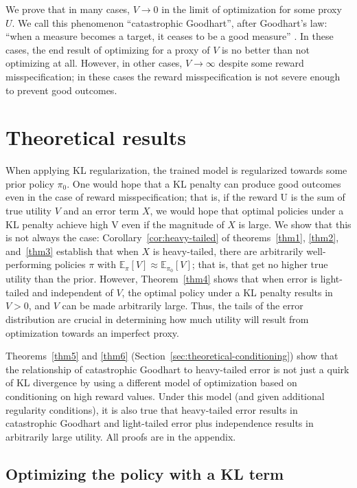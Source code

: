 \documentclass{article}
\begin{document}
We prove that in many cases, $V \to 0$ in the limit of optimization for some proxy $U$. We call this phenomenon ``catastrophic Goodhart'', after Goodhart's law: ``when a measure becomes a target, it ceases to be a good measure'' \citep{Strathern_1997}. In these cases, the end result of optimizing for a proxy of $V$ is no better than not optimizing at all. However, in other cases, $V \to \infty$ despite some reward misspecification; in these cases the reward misspecification is not severe enough to prevent good outcomes. 

\section{Theoretical results}

When applying KL regularization, the trained model is regularized towards some prior policy $\pi_0$. One would hope that a KL penalty can produce good outcomes even in the case of reward misspecification; that is, if the reward U is the sum of true utility $V$ and an error term $X$, we would hope that optimal policies under a KL penalty achieve high V even if the magnitude of $X$ is large. We show that this is not always the case: Corollary~\ref{cor:heavy-tailed} of theorems~\ref{thm1}, \ref{thm2}, and~\ref{thm3} establish that when $X$ is heavy-tailed, there are arbitrarily well-performing policies $\pi$ with $\mathbb E_{\pi}[V] \approx \mathbb E_{\pi_0}[V]$; that is, that get no higher true utility than the prior. However, Theorem~\ref{thm4} shows that when error is light-tailed and independent of $V$, the optimal policy under a KL penalty results in $V > 0$, and $V$ can be made arbitrarily large. Thus, the tails of the error distribution are crucial in determining how much utility will result from optimization towards an imperfect proxy.

Theorems~\ref{thm5} and \ref{thm6} (Section~\ref{sec:theoretical-conditioning}) show that the relationship of catastrophic Goodhart to heavy-tailed error is not just a quirk of KL divergence by using a different model of optimization based on conditioning on high reward values. Under this model (and given additional regularity conditions), it is also true that heavy-tailed error results in catastrophic Goodhart and light-tailed error plus independence results in arbitrarily large utility. All proofs are in the appendix.

\subsection{Optimizing the policy with a KL term\label{sec:theoretical-kl}}
\end{document}
